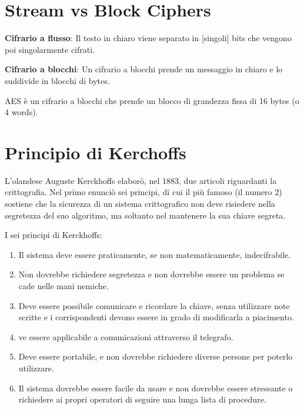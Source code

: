 \section{Stream vs Block Ciphers}

       

\textsf{\small \textbf{Cifrario a flusso}: Il testo in chiaro viene separato in [singoli] bits che vengono poi singolarmente cifrati.} 

\textsf{\small \textbf{Cifrario a blocchi}: Un cifrario a blocchi prende un messaggio in chiaro e lo suddivide in blocchi di bytes.} 

\textsf{\small  AES è un cifrario a blocchi che prende un blocco di grandezza fissa di 16 bytes (o 4 words).}


\section{Principio di Kerchoffs}


\textsf{\small L'olandese Auguste Kerckhoffs elaborò, nel 1883, due articoli riguardanti la crittografia. Nel primo enunciò sei principi, di cui il più famoso (il numero 2) sostiene che la sicurezza di un sistema crittografico non deve risiedere nella segretezza del suo algoritmo, ma soltanto nel mantenere la sua chiave segreta.} %

\textsf{\small I sei principi di Kerckhoffs:}


\begin{enumerate}
	\item \textsf{\small Il sistema deve essere praticamente, se non matematicamente, indecifrabile.} %
	\item \textsf{\small Non dovrebbe richiedere segretezza e non dovrebbe essere un problema se cade nelle mani nemiche.} %
	\item \textsf{\small Deve essere possibile comunicare e ricordare la chiave, senza utilizzare note scritte e i corrispondenti devono essere in grado di modificarla a piacimento.} %
	\item \textsf{\small ve essere applicabile a comunicazioni attraverso il telegrafo.} %
	\item \textsf{\small  Deve essere portabile, e non dovrebbe richiedere diverse persone per poterlo utilizzare.} %
	\item \textsf{\small Il sistema dovrebbe essere facile da usare e non dovrebbe essere stressante o richiedere ai propri operatori di seguire una lunga lista di procedure.} %
\end{enumerate}


